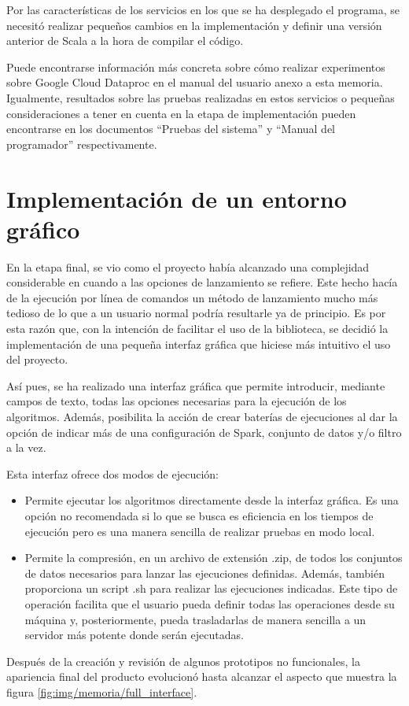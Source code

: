Por las características de los servicios en los que se ha desplegado el programa, se necesitó realizar pequeños cambios en la implementación y definir una versión anterior de Scala a la hora de compilar el código.

Puede encontrarse información más concreta sobre cómo realizar experimentos sobre Google Cloud Dataproc en el manual del usuario anexo a esta memoria. Igualmente, resultados sobre las pruebas realizadas en estos servicios o pequeñas consideraciones a tener en cuenta en la etapa de implementación pueden encontrarse en los documentos ``Pruebas del sistema'' y ``Manual del programador'' respectivamente. 

\section{Implementación de un entorno gráfico}

En la etapa final, se vio como el proyecto había alcanzado una complejidad considerable en cuando a las opciones de lanzamiento se refiere. Este hecho hacía de la ejecución por línea de comandos un método de lanzamiento mucho más tedioso de lo que a un usuario normal podría resultarle ya de principio. Es por esta razón que, con la intención de facilitar el uso de la biblioteca, se decidió la implementación de una pequeña interfaz gráfica que hiciese más intuitivo el uso del proyecto.

Así pues, se ha realizado una interfaz gráfica que permite introducir, mediante campos de texto, todas las opciones necesarias para la ejecución de los algoritmos. Además, posibilita la acción de crear baterías de ejecuciones al dar la opción de indicar más de una configuración de Spark, conjunto de datos y/o filtro a la vez.

Esta interfaz ofrece dos modos de ejecución:

\begin{itemize}
\item Permite ejecutar los algoritmos directamente desde la interfaz gráfica. Es una opción no recomendada si lo que se busca es eficiencia en los tiempos de ejecución pero es una manera sencilla de realizar pruebas en modo local.
\item Permite la compresión, en un archivo de extensión .zip, de todos los conjuntos de datos necesarios para lanzar las ejecuciones definidas. Además, también proporciona un script .sh para realizar las ejecuciones indicadas. Este tipo de operación facilita que el usuario pueda definir todas las operaciones desde su máquina y, posteriormente, pueda trasladarlas de manera sencilla a un servidor más potente donde serán ejecutadas.
\end{itemize}

Después de la creación y revisión de algunos prototipos no funcionales, la apariencia final del producto evolucionó hasta alcanzar el aspecto que muestra la figura \ref{fig:img/memoria/full_interface}.


